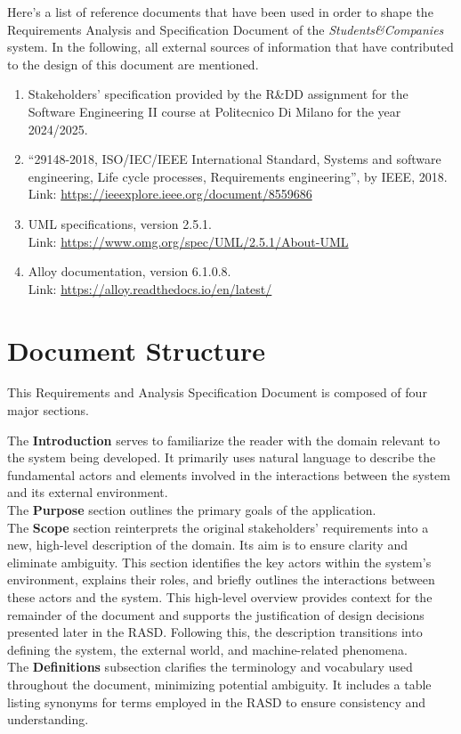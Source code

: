 Here’s a list of reference documents that have been used in order to shape the Requirements Analysis and Specification Document of the \textit{Students\&Companies} system. In the following, all external sources of information that have contributed to the design of this document are mentioned.

\begin{enumerate}
    \item Stakeholders’ specification provided by the R\&DD assignment for the Software Engineering II course at Politecnico Di Milano for the year 2024/2025.
    \item ``29148-2018, ISO/IEC/IEEE International Standard, Systems and software engineering, Life cycle processes, Requirements engineering'', by IEEE, 2018. \\
    Link: \url{https://ieeexplore.ieee.org/document/8559686}
    \item UML specifications, version 2.5.1. \\
    Link: \url{https://www.omg.org/spec/UML/2.5.1/About-UML}
    \item Alloy documentation, version 6.1.0.8. \\
    Link: \url{https://alloy.readthedocs.io/en/latest/}
\end{enumerate}

\newpage
\section{Document Structure}

This Requirements and Analysis Specification Document is composed of four major sections.

The \textbf{Introduction} serves to familiarize the reader with the domain relevant to the system being developed. It primarily uses natural language to describe the fundamental actors and elements involved in the interactions between the system and its external environment. \\
The \textbf{Purpose} section outlines the primary goals of the application. \\
The \textbf{Scope} section reinterprets the original stakeholders’ requirements into a new, high-level description of the domain. Its aim is to ensure clarity and eliminate ambiguity. This section identifies the key actors within the system's environment, explains their roles, and briefly outlines the interactions between these actors and the system. This high-level overview provides context for the remainder of the document and supports the justification of design decisions presented later in the RASD. Following this, the description transitions into defining the system, the external world, and machine-related phenomena. \\
The \textbf{Definitions} subsection clarifies the terminology and vocabulary used throughout the document, minimizing potential ambiguity. It includes a table listing synonyms for terms employed in the RASD to ensure consistency and understanding.

